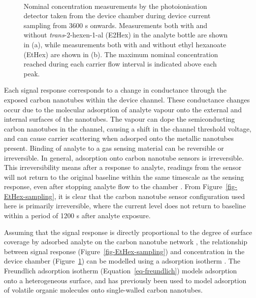 \documentclass[
  a4paper,
]{scrbook}
\begin{document}
\begin{figure}
\begin{minipage}[t]{0.85\linewidth}
{{}

}

\end{minipage}%
%
\begin{minipage}[t]{0.07\linewidth}

{\centering 

~

}

\end{minipage}%

\caption[Nominal concentration measurements by the photoionisation
detector taken from the device chamber during device current sampling
from 3600 s onwards, with and without \emph{trans}-2-hexen-1-al (E2Hex)
or ethyl hexanoate (EtHex) present in the analyte
bottle.]{\label{fig-EtHex-sampling-PID}Nominal concentration
measurements by the photoionisation detector taken from the device
chamber during device current sampling from 3600 s onwards. Measurements
both with and without \emph{trans}-2-hexen-1-al (E2Hex) in the analyte
bottle are shown in (a), while measurements both with and without ethyl
hexanoate (EtHex) are shown in (b). The maximum nominal concentration
reached during each carrier flow interval is indicated above each peak.}

\end{figure}

Each signal response corresponds to a change in conductance through the
exposed carbon nanotubes within the device channel. These conductance
changes occur due to the molecular adsorption of analyte vapour onto the
external and internal surfaces of the nanotubes. The vapour can dope the
semiconducting carbon nanotubes in the channel, causing a shift in the
channel threshold voltage, and can cause carrier scattering when
adsorped onto the metallic nanotubes present. Binding of analyte to a
gas sensing material can be reversible or irreversible. In general,
adsorption onto carbon nanotube sensors is irreversible. This
irreversibility means after a response to analyte, readings from the
sensor will not return to the original baseline within the same
timescale as the sensing response, even after stopping analyte flow to
the chamber \autocite{Agnihotri2005,Lee2005}. From
Figure~\ref{fig-EtHex-sampling}, it is clear that the carbon nanotube
sensor configuration used here is primarily irreversible, where the
current level does not return to baseline within a period of 1200 s
after analyte exposure.

Assuming that the signal response is directly proportional to the degree
of surface coverage by adsorbed analyte on the carbon nanotube network
\autocite{Lee2005}, the relationship between signal response
(Figure~\ref{fig-EtHex-sampling}) and concentration in the device
chamber (Figure~\ref{fig-EtHex-sampling-PID}) can be modelled using a
adsorption isotherm \autocite{Agnihotri2005}. The Freundlich adsorption
isotherm (Equation~\ref{eq-freundlich}) models adsorption onto a
heterogeneous surface, and has previously been used to model adsorption
of volatile organic molecules onto single-walled carbon nanotubes.
\end{document}
